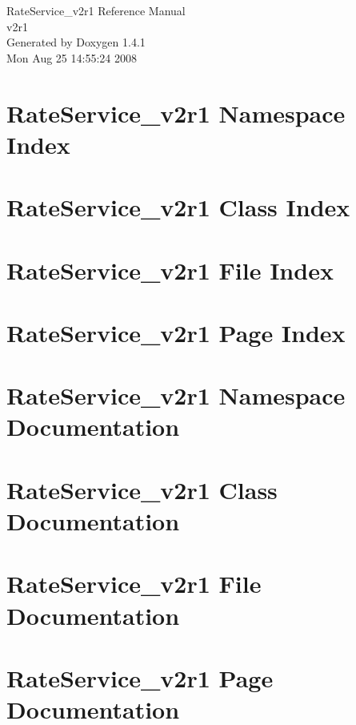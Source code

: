 \documentclass[a4paper]{book}
\begin{document}
\begin{titlepage}
\vspace*{7cm}
\begin{center}
{\Large Rate\-Service\_\-v2r1 Reference Manual\\[1ex]\large v2r1 }\\
\vspace*{1cm}
{\large Generated by Doxygen 1.4.1}\\
\vspace*{0.5cm}
{\small Mon Aug 25 14:55:24 2008}\\
\end{center}
\end{titlepage}
\clearemptydoublepage
{}
\tableofcontents
\clearemptydoublepage
{}
\chapter{Rate\-Service\_\-v2r1 Namespace Index}

\chapter{Rate\-Service\_\-v2r1 Class Index}

\chapter{Rate\-Service\_\-v2r1 File Index}

\chapter{Rate\-Service\_\-v2r1 Page Index}

\chapter{Rate\-Service\_\-v2r1 Namespace Documentation}

\chapter{Rate\-Service\_\-v2r1 Class Documentation}




\chapter{Rate\-Service\_\-v2r1 File Documentation}






\chapter{Rate\-Service\_\-v2r1 Page Documentation}

\printindex
\end{document}
